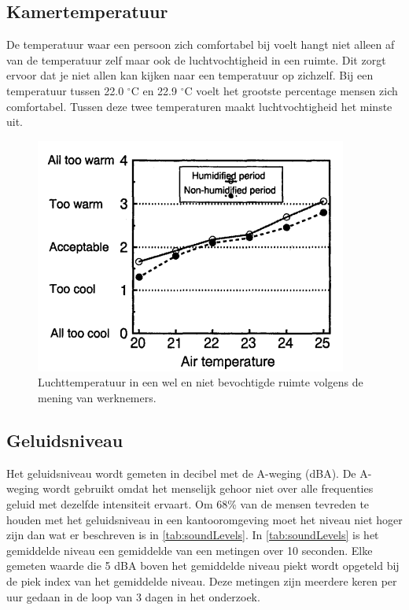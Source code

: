 \subsection{Kamertemperatuur}
De temperatuur waar een persoon zich comfortabel bij voelt hangt niet alleen af van de temperatuur zelf maar ook de luchtvochtigheid in een ruimte\cite{palonen1993effects}. Dit zorgt ervoor dat je niet allen kan kijken naar een temperatuur op zichzelf. Bij een temperatuur tussen 22.0 $^{\circ}$C en 22.9 $^{\circ}$C voelt het grootste percentage mensen zich comfortabel. Tussen deze twee temperaturen maakt luchtvochtigheid het minste uit. 
\begin{figure}[ht]
    \centering
    \includegraphics[scale=0.8]{img/tempHumidGraph.png}
    \caption{Luchttemperatuur in een wel en niet bevochtigde ruimte volgens de mening van werknemers\cite{palonen1993effects}.}
\end{figure}


\subsection{Geluidsniveau}
Het geluidsniveau wordt gemeten in decibel met de A-weging (dBA)\cite{aWeighting}. De A-weging wordt gebruikt omdat het menselijk gehoor niet over alle frequenties geluid met dezelfde intensiteit ervaart. Om 68\% van de mensen tevreden te houden met het geluidsniveau in een kantooromgeving moet het niveau niet hoger zijn dan wat er beschreven is in \autoref{tab:soundLevels}\cite{geluid-levels}. In \autoref{tab:soundLevels} is het gemiddelde niveau een gemiddelde van een metingen over 10 seconden. Elke gemeten waarde die 5 dBA boven het gemiddelde niveau piekt wordt opgeteld bij de piek index van het gemiddelde niveau. Deze metingen zijn meerdere keren per uur gedaan in de loop van 3 dagen in het onderzoek\cite{geluid-levels}. 

